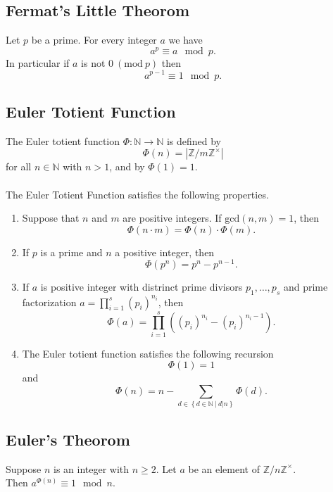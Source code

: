 \documentclass[fleqn]{article}
\begin{document}
\subsection{Fermat's Little Theorom}
Let $p$ be a prime. For every integer $a$ we have
\begin{equation*}
    a^p \equiv a \mod p.
\end{equation*}
In particular if $a$ is not $0\ (\text{mod}\ p)$ then
\begin{equation*}
    a^{p-1} \equiv 1 \mod p.
\end{equation*}

\subsection{Euler Totient Function}
The Euler totient function $\Phi : \mathbb{N} \to \mathbb{N}$ is defined by
\begin{equation*}
    \Phi(n) = |\mathbb{Z}/m\mathbb{Z}^{\times}|
\end{equation*}
for all $n \in \mathbb{N}$ with $n > 1$, and by $\Phi(1) = 1$.\\
\\
The Euler Totient Function satisfies the following properties.
\begin{enumerate}
    \item Suppose that $n$ and $m$ are positive integers. If $\text{gcd}(n,m) = 1$, then
        \begin{equation*}
            \Phi(n \cdot m) = \Phi(n) \cdot \Phi(m).
        \end{equation*}
    \item If $p$ is a prime and $n$ a positive integer, then
        \begin{equation*}
            \Phi(p^n) = p^n - p^{n-1}.
        \end{equation*}
    \item If $a$ is positive integer with distrinct prime divisors $p_1,\dots,p_s$
        and prime factorization $a = \prod_{i=1}^s (p_i)^{n_i}$, then
        \begin{equation*}
            \Phi(a) = \prod_{i=1}^s \left( (p_i)^{n_i} - (p_i)^{n_i-1} \right).
        \end{equation*}
    \item The Euler totient function satisfies the following recursion
        \begin{equation*}
            \Phi(1)= 1
        \end{equation*}
        and
        \begin{equation*}
            \Phi(n) = n - \sum_{d \in \left\{ d \in \mathbb{N}\ |\  d|n \right\}} \Phi(d).
        \end{equation*}
\end{enumerate}

\subsection{Euler's Theorom}
Suppose $n$ is an integer with $n \geq 2$. Let $a$ be an element of $\mathbb{Z}/n\mathbb{Z}^\times$.\\
Then $a^{\Phi(n)} \equiv 1 \mod n$.
\end{document}
